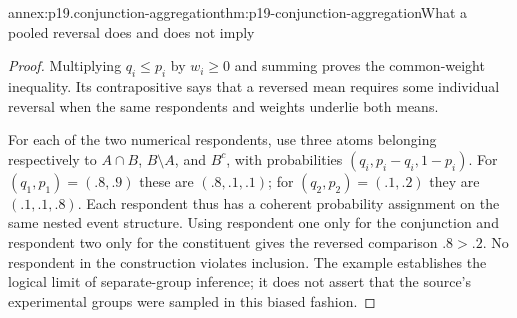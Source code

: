 \begin{annexitem}{annex:p19.conjunction-aggregation}{thm:p19-conjunction-aggregation}{What a pooled reversal does and does not imply}
\begin{proof}
Multiplying \(q_i\leq p_i\) by \(w_i\geq0\) and
summing proves the common-weight inequality.
Its contrapositive says that a reversed mean
requires some individual reversal when the same
respondents and weights underlie both means.

For each of the two numerical respondents, use
three atoms belonging respectively to \(A\cap B\),
\(B\setminus A\), and \(B^c\), with probabilities
\((q_i,p_i-q_i,1-p_i)\).
For \((q_1,p_1)=(.8,.9)\) these are
\((.8,.1,.1)\); for \((q_2,p_2)=(.1,.2)\)
they are \((.1,.1,.8)\). Each respondent thus
has a coherent probability assignment on the
same nested event structure.
Using respondent one only for the conjunction
and respondent two only for the constituent
gives the reversed comparison \(.8>.2\).
No respondent in the construction violates
inclusion. The example establishes the logical
limit of separate-group inference; it does not
assert that the source's experimental groups
were sampled in this biased fashion.
\end{proof}
\end{annexitem}

